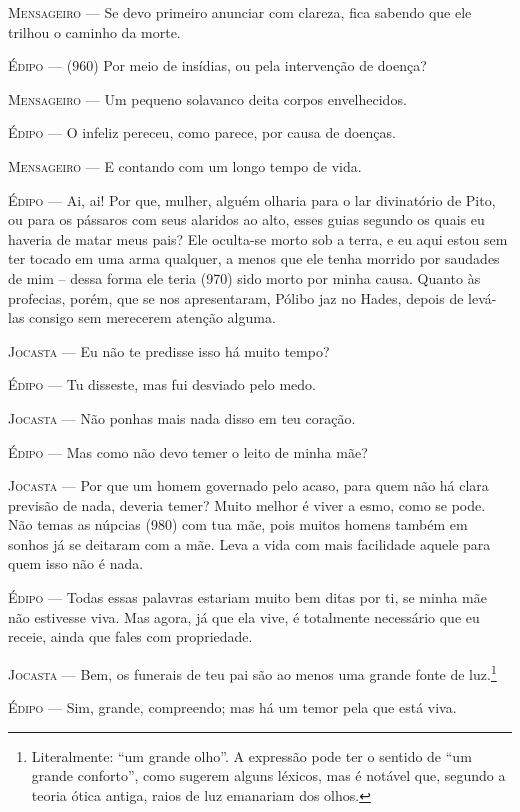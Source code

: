 \textsc{Mensageiro} --- Se devo primeiro anunciar com clareza, fica sabendo que ele trilhou o
caminho da morte.

\textsc{Édipo} --- (960) Por meio de insídias, ou pela intervenção de doença?

\textsc{Mensageiro} --- Um pequeno solavanco deita corpos envelhecidos.

\textsc{Édipo} --- O infeliz pereceu, como parece, por causa de doenças.

\textsc{Mensageiro} --- E contando com um longo tempo de vida.

\textsc{Édipo} --- Ai, ai! Por que, mulher, alguém olharia para o lar divinatório de Pito,
ou para os pássaros com seus alaridos ao alto, esses guias segundo os
quais eu haveria de matar meus pais? Ele oculta-se morto sob a terra, e
eu aqui estou sem ter tocado em uma arma qualquer, a menos que ele tenha
morrido por saudades de mim -- dessa forma ele teria (970) sido morto por
minha causa. Quanto às profecias, porém, que se nos apresentaram, Pólibo
jaz no Hades, depois de levá-las consigo sem merecerem atenção alguma.

\textsc{Jocasta} --- Eu não te predisse isso há muito tempo?

\textsc{Édipo} --- Tu disseste, mas fui desviado pelo medo.

\textsc{Jocasta} --- Não ponhas mais nada disso em teu coração.

\textsc{Édipo} --- Mas como não devo temer o leito de minha mãe?

\textsc{Jocasta} --- Por que um homem governado pelo acaso, para quem não há clara previsão
de nada, deveria temer? Muito melhor é viver a esmo, como se pode. Não
temas as núpcias (980) com tua mãe, pois muitos homens também em sonhos
já se deitaram com a mãe. Leva a vida com mais facilidade aquele para
quem isso não é nada.

\textsc{Édipo} --- Todas essas palavras estariam muito bem ditas por ti, se minha mãe não
estivesse viva. Mas agora, já que ela vive, é totalmente necessário que
eu receie, ainda que fales com propriedade.

\textsc{Jocasta} --- Bem, os funerais de teu pai são ao menos uma grande fonte de
luz.\footnote{Literalmente: ``um grande olho''. A expressão pode ter o
  sentido de ``um grande conforto'', como sugerem alguns léxicos, mas é
  notável que, segundo a teoria ótica antiga, raios de luz emanariam dos
  olhos.}

\textsc{Édipo} --- Sim, grande, compreendo; mas há um temor pela que está viva.

